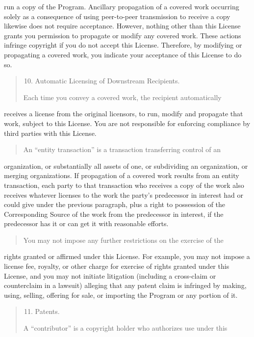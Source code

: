 \documentclass[letterpaper,10pt,english]{sphinxmanual}
\begin{document}
run a copy of the Program.  Ancillary propagation of a covered work
occurring solely as a consequence of using peer-to-peer transmission
to receive a copy likewise does not require acceptance.  However,
nothing other than this License grants you permission to propagate or
modify any covered work.  These actions infringe copyright if you do
not accept this License.  Therefore, by modifying or propagating a
covered work, you indicate your acceptance of this License to do so.
\begin{quote}
\begin{enumerate}
\setcounter{enumi}{9}
\item {} 
Automatic Licensing of Downstream Recipients.

\end{enumerate}

Each time you convey a covered work, the recipient automatically
\end{quote}

receives a license from the original licensors, to run, modify and
propagate that work, subject to this License.  You are not responsible
for enforcing compliance by third parties with this License.
\begin{quote}

An “entity transaction” is a transaction transferring control of an
\end{quote}

organization, or substantially all assets of one, or subdividing an
organization, or merging organizations.  If propagation of a covered
work results from an entity transaction, each party to that
transaction who receives a copy of the work also receives whatever
licenses to the work the party’s predecessor in interest had or could
give under the previous paragraph, plus a right to possession of the
Corresponding Source of the work from the predecessor in interest, if
the predecessor has it or can get it with reasonable efforts.
\begin{quote}

You may not impose any further restrictions on the exercise of the
\end{quote}

rights granted or affirmed under this License.  For example, you may
not impose a license fee, royalty, or other charge for exercise of
rights granted under this License, and you may not initiate litigation
(including a cross-claim or counterclaim in a lawsuit) alleging that
any patent claim is infringed by making, using, selling, offering for
sale, or importing the Program or any portion of it.
\begin{quote}
\begin{enumerate}
\setcounter{enumi}{10}
\item {} 
Patents.

\end{enumerate}

A “contributor” is a copyright holder who authorizes use under this
\end{quote}
\end{document}
